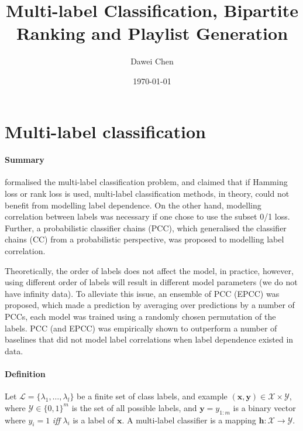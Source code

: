 \documentclass[9pt]{extarticle}
\title{Multi-label Classification, Bipartite Ranking and Playlist Generation}
\author{Dawei Chen}
\date{\today}
\newcommand{\h}{\mathbf{h}}
\newcommand{\x}{\mathbf{x}}
\newcommand{\y}{\mathbf{y}}
\newcommand{\1}{\mathbf{1}}
\newcommand{\LCal}{\mathcal{L}}
\newcommand{\XCal}{\mathcal{X}}
\newcommand{\YCal}{\mathcal{Y}}
\begin{document}
\maketitle

\section{Multi-label classification}
\label{sec:mlc}

\paragraph{Summary}
\citet{dembczynski:2010} formalised the multi-label classification problem, 
and claimed that if Hamming loss or rank loss is used,
multi-label classification methods, in theory, could not benefit from modelling label dependence.
On the other hand, modelling correlation between labels was necessary if one chose to use the subset 0/1 loss.
Further, a probabilistic classifier chains (PCC), which generalised the classifier chains (CC) from a probabilistic perspective,
was proposed to modelling label correlation. 

Theoretically, the order of labels does not affect the model, 
in practice, however, using different order of labels will result in different model parameters (we do not have infinity data).
To alleviate this issue, an ensemble of PCC (EPCC) was proposed, which made a prediction by averaging over predictions by a number of PCCs, 
each model was trained using a randomly chosen permutation of the labels.
PCC (and EPCC) was empirically shown to outperform a number of baselines that did not model label correlations when label dependence existed in data.


\noindent
\paragraph{Definition}
Let $\LCal = \{\lambda_1,\dots,\lambda_l\}$ be a finite set of class labels,
and example $(\x,\y) \in \XCal \times \YCal$, 
where $\YCal \in \{0,1\}^m$ is the set of all possible labels,
and $\y=y_{1:m}$ is a binary vector where $y_i = 1$ \emph{iff} $\lambda_i$ is a label of $\x$.
A multi-label classifier is a mapping $\h: \XCal \to \YCal$.

\noindent
\end{document}
